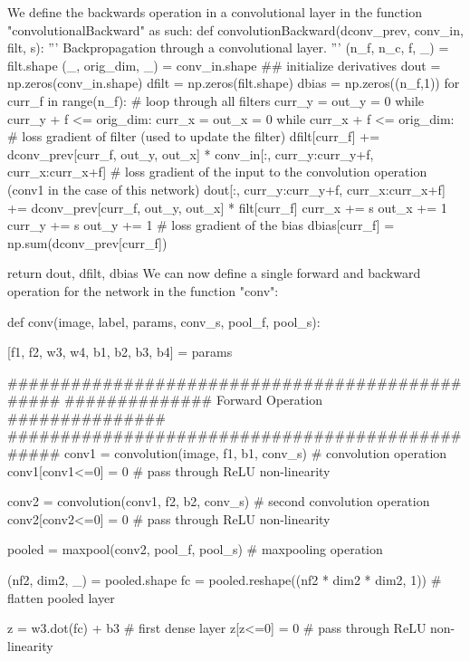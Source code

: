 \startsubsection[title=Forward and backward operation of network]
We define the backwards operation in a convolutional layer in the function "convolutionalBackward" as such:
\starttyping
def convolutionBackward(dconv_prev, conv_in, filt, s):
    '''
    Backpropagation through a convolutional layer. 
    '''
    (n_f, n_c, f, _) = filt.shape
    (_, orig_dim, _) = conv_in.shape
    ## initialize derivatives
    dout = np.zeros(conv_in.shape) 
    dfilt = np.zeros(filt.shape)
    dbias = np.zeros((n_f,1))
    for curr_f in range(n_f):
        # loop through all filters
        curr_y = out_y = 0
        while curr_y + f <= orig_dim:
            curr_x = out_x = 0
            while curr_x + f <= orig_dim:
                # loss gradient of filter (used to update the filter)
                dfilt[curr_f] += dconv_prev[curr_f, out_y, out_x] * conv_in[:, curr_y:curr_y+f, curr_x:curr_x+f]
                # loss gradient of the input to the convolution operation (conv1 in the case of this network)
                dout[:, curr_y:curr_y+f, curr_x:curr_x+f] += dconv_prev[curr_f, out_y, out_x] * filt[curr_f] 
                curr_x += s
                out_x += 1
            curr_y += s
            out_y += 1
        # loss gradient of the bias
        dbias[curr_f] = np.sum(dconv_prev[curr_f])
    
    return dout, dfilt, dbias
\stoptyping
We can now define a single forward and backward operation for the network in the function "conv":

\starttyping
def conv(image, label, params, conv_s, pool_f, pool_s):
    
    [f1, f2, w3, w4, b1, b2, b3, b4] = params 
    
    ################################################
    ############## Forward Operation ###############
    ################################################
    conv1 = convolution(image, f1, b1, conv_s) # convolution operation
    conv1[conv1<=0] = 0 # pass through ReLU non-linearity
    
    conv2 = convolution(conv1, f2, b2, conv_s) # second convolution operation
    conv2[conv2<=0] = 0 # pass through ReLU non-linearity
    
    pooled = maxpool(conv2, pool_f, pool_s) # maxpooling operation
    
    (nf2, dim2, _) = pooled.shape
    fc = pooled.reshape((nf2 * dim2 * dim2, 1)) # flatten pooled layer
    
    z = w3.dot(fc) + b3 # first dense layer
    z[z<=0] = 0 # pass through ReLU non-linearity
    
